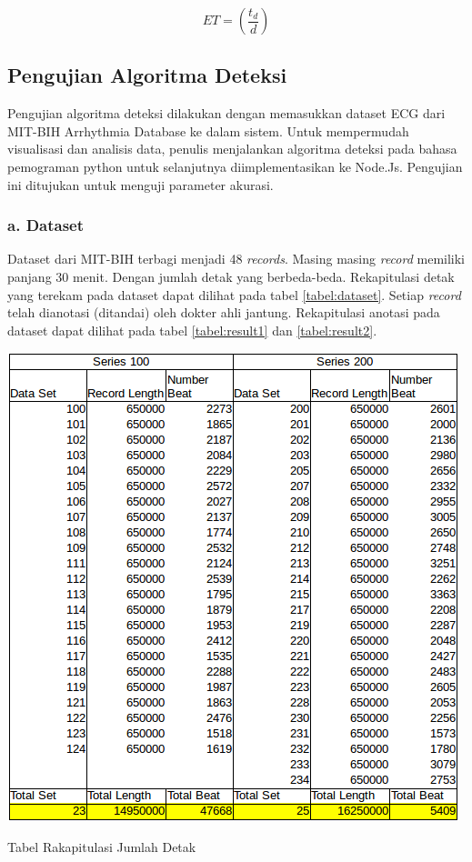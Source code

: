 \begin{equation}
ET = (\frac{t_d}{d})
\label{eq:exec_time} 
\end{equation}


\subsection{Pengujian Algoritma Deteksi}
Pengujian algoritma deteksi dilakukan dengan memasukkan dataset ECG dari MIT-BIH Arrhythmia Database \cite{mit_bih_paper, mit_bih_web} ke dalam sistem. Untuk mempermudah visualisasi dan analisis data, penulis menjalankan algoritma deteksi pada bahasa pemograman python untuk selanjutnya diimplementasikan ke Node.Js. Pengujian ini ditujukan untuk menguji parameter akurasi.

\subsubsection{a. Dataset}
Dataset dari MIT-BIH \cite{mit_bih_paper, mit_bih_web} terbagi menjadi 48 \textit{records}. Masing masing \textit{record} memiliki panjang 30 menit. Dengan jumlah detak yang berbeda-beda. Rekapitulasi detak yang terekam pada dataset dapat dilihat pada tabel \ref{tabel:dataset}. Setiap \textit{record} telah dianotasi (ditandai) oleh dokter ahli jantung\cite{mit_bih_web}. Rekapitulasi anotasi pada dataset dapat dilihat pada tabel \ref{tabel:result1}  dan \ref{tabel:result2}.

\begin{table}[H]
	\centering
	\includegraphics[scale=0.7]{images/tabel_data.png}
	\caption{Tabel Rakapitulasi Jumlah Detak}
	\label{tabel:dataset}
\end{table}	

